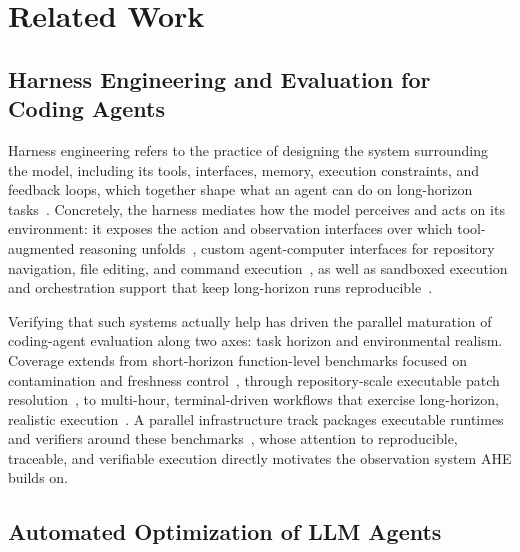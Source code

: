 \section{Related Work}
\label{sec:related}

\subsection{Harness Engineering and Evaluation for Coding Agents}
\label{ssec:related_harness}
Harness engineering refers to the practice of designing the system surrounding the model, including its tools, interfaces, memory, execution constraints, and feedback loops, which together shape what an agent can do on long-horizon tasks~\citep{rajasekaranHarnessDesignLongrunning2026,lopopoloHarnessEngineeringLeveraging2026,trivedyImprovingDeepAgents2026,anthropicClaudecode2025,steinbergerOpenClawPersonalAI2026,HermesAgentAgent}.
Concretely, the harness mediates how the model perceives and acts on its environment: it exposes the action and observation interfaces over which tool-augmented reasoning unfolds~\citep{anthropicClaudecode2025}, custom agent-computer interfaces for repository navigation, file editing, and command execution~\citep{yangSWEagentAgentComputerInterfaces2024}, as well as sandboxed execution and orchestration support that keep long-horizon runs reproducible~\citep{wangOpenHandsOpenPlatform2025}.

Verifying that such systems actually help has driven the parallel maturation of coding-agent evaluation along two axes: task horizon and environmental realism.
Coverage extends from short-horizon function-level benchmarks focused on contamination and freshness control~\citep{zhuoBigCodeBenchBenchmarkingCode2024,jainLiveCodeBenchHolisticContamination2024}, through repository-scale executable patch resolution~\citep{jimenezSWEbenchCanLanguage2023,yangSWEbenchMultimodalAI2024,dengSWEBenchProCan2025}, to multi-hour, terminal-driven workflows that exercise long-horizon, realistic execution~\citep{miserendinoSWELancerCanFrontier2025,chanMLEbenchEvaluatingMachine2024,merrillTerminalBenchBenchmarkingAgents2026a}.
A parallel infrastructure track packages executable runtimes and verifiers around these benchmarks~\citep{panTrainingSoftwareEngineering2025,jainR2EGymProceduralEnvironment2025,zengSWEHubUnifiedProduction2026}, whose attention to reproducible, traceable, and verifiable execution directly motivates the observation system AHE builds on.


\subsection{Automated Optimization of LLM Agents}
\label{ssec:related_auto}

